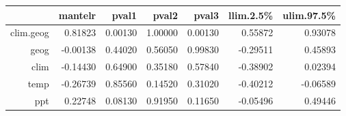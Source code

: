\begin{table}[ht]
\centering
\begin{tabular}{rrrrrrr}
  \hline
 & mantelr & pval1 & pval2 & pval3 & llim.2.5\% & ulim.97.5\% \\ 
  \hline
clim.geog & 0.81823 & 0.00130 & 1.00000 & 0.00130 & 0.55872 & 0.93078 \\ 
  geog & -0.00138 & 0.44020 & 0.56050 & 0.99830 & -0.29511 & 0.45893 \\ 
  clim & -0.14430 & 0.64900 & 0.35180 & 0.57840 & -0.38902 & 0.02394 \\ 
  temp & -0.26739 & 0.85560 & 0.14520 & 0.31020 & -0.40212 & -0.06589 \\ 
  ppt & 0.22748 & 0.08130 & 0.91950 & 0.11650 & -0.05496 & 0.49446 \\ 
   \hline
\end{tabular}
\end{table}
